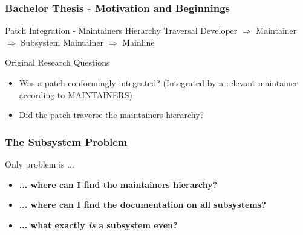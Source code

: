 \documentclass{beamer}
\begin{document}
	\begin{frame}
	\frametitle{Bachelor Thesis - Motivation and Beginnings}
		\begin{block}{Patch Integration - Maintainers Hierarchy Traversal}
			Developer $\Rightarrow$ Maintainer $\Rightarrow$ Subsystem Maintainer $\Rightarrow$ Mainline
		\end{block}
		\begin{block}{Original Research Questions}
			\begin{itemize}
				\item Was a patch conformingly integrated? (Integrated by a relevant maintainer according to MAINTAINERS)
				\item Did the patch traverse the maintainers hierarchy?
			\end{itemize}
		\end{block}
	\end{frame}


	\begin{frame}
	\frametitle{The Subsystem Problem}
		\begin{alertblock}{Only problem is ...}
			\begin{itemize}
				\item \textbf{... where can I find the maintainers hierarchy?}
				\item \textbf{... where can I find the documentation on all subsystems?}
				\item \textbf{... what exactly \textit{is} a subsystem even?}
			\end{itemize}
		\end{alertblock}
	\end{frame}
\end{document}
